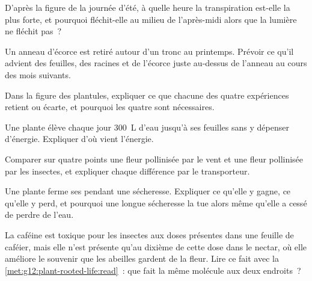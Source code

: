\begin{exercise}[$\star\star$]\label{exo:g12:plant-rooted-life:7}
D'après la figure de la journée d'été, à quelle heure la transpiration
est-elle la plus forte, et pourquoi fléchit-elle au milieu de
l'après-midi alors que la lumière ne fléchit pas~?
\end{exercise}

\begin{exercise}[$\star\star$]\label{exo:g12:plant-rooted-life:8}
Un anneau d'écorce est retiré autour d'un tronc au printemps. Prévoir
ce qu'il advient des feuilles, des racines et de l'écorce juste
au-dessus de l'anneau au cours des mois suivants.
\end{exercise}

\begin{exercise}[$\star\star$]\label{exo:g12:plant-rooted-life:9}
Dans la figure des plantules, expliquer ce que chacune des quatre
expériences retient ou écarte, et pourquoi les quatre sont
nécessaires.
\end{exercise}

\begin{exercise}[$\star\star$]\label{exo:g12:plant-rooted-life:10}
Une plante élève chaque jour \qty{300}{L} d'eau jusqu'à ses feuilles
sans y dépenser d'énergie. Expliquer d'où vient l'énergie.
\end{exercise}

\begin{exercise}[$\star\star$]\label{exo:g12:plant-rooted-life:11}
Comparer sur quatre points une fleur pollinisée par le vent et une
fleur pollinisée par les insectes, et expliquer chaque différence par
le transporteur.
\end{exercise}

\begin{exercise}[$\star\star\star$]\label{exo:g12:plant-rooted-life:12}
Une plante ferme ses  pendant une sécheresse. Expliquer ce
qu'elle y gagne, ce qu'elle y perd, et pourquoi une longue sécheresse
la tue alors même qu'elle a cessé de perdre de l'eau.
\end{exercise}

\begin{exercise}[$\star\star\star$]\label{exo:g12:plant-rooted-life:13}
La caféine est toxique pour les insectes aux doses présentes dans une
feuille de caféier, mais elle n'est présente qu'au dixième de cette
dose dans le nectar, où elle améliore le souvenir que les abeilles
gardent de la fleur. Lire ce fait avec la
\cref{met:g12:plant-rooted-life:read}~: que fait la même molécule aux
deux endroits~?
\end{exercise}

